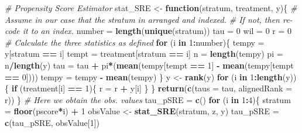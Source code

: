 \documentclass[]{article}
\newenvironment{Shaded}{\begin{snugshade}}{\end{snugshade}}
\newcommand{\KeywordTok}[1]{\textcolor[rgb]{0.13,0.29,0.53}{\textbf{#1}}}
\newcommand{\DataTypeTok}[1]{\textcolor[rgb]{0.13,0.29,0.53}{#1}}
\newcommand{\DecValTok}[1]{\textcolor[rgb]{0.00,0.00,0.81}{#1}}
\newcommand{\StringTok}[1]{\textcolor[rgb]{0.31,0.60,0.02}{#1}}
\newcommand{\CommentTok}[1]{\textcolor[rgb]{0.56,0.35,0.01}{\textit{#1}}}
\newcommand{\ControlFlowTok}[1]{\textcolor[rgb]{0.13,0.29,0.53}{\textbf{#1}}}
\newcommand{\OperatorTok}[1]{\textcolor[rgb]{0.81,0.36,0.00}{\textbf{#1}}}
\newcommand{\NormalTok}[1]{#1}
\begin{document}
\begin{Shaded}
\begin{Highlighting}[]
\CommentTok{# Propensity Score Estimator}
\NormalTok{stat_SRE <-}\StringTok{ }\ControlFlowTok{function}\NormalTok{(stratum, treatment, y)\{}
  \CommentTok{# Assume in our case that the stratum in arranged and indexed.}
  \CommentTok{# If not, then re-code it to an index.}
\NormalTok{  number =}\StringTok{ }\KeywordTok{length}\NormalTok{(}\KeywordTok{unique}\NormalTok{(stratum))}
\NormalTok{  tau =}\StringTok{ }\DecValTok{0}
\NormalTok{  wil =}\StringTok{ }\DecValTok{0}
\NormalTok{  r =}\StringTok{ }\DecValTok{0}
  \CommentTok{# Calculate the three statistics as defined}
  \ControlFlowTok{for}\NormalTok{ (i }\ControlFlowTok{in} \DecValTok{1}\OperatorTok{:}\NormalTok{number)\{}
\NormalTok{    tempy =}\StringTok{ }\NormalTok{y[stratum }\OperatorTok{==}\StringTok{ }\NormalTok{i]}
\NormalTok{    tempt =}\StringTok{ }\NormalTok{treatment[stratum }\OperatorTok{==}\StringTok{ }\NormalTok{i]}
\NormalTok{    n =}\StringTok{ }\KeywordTok{length}\NormalTok{(tempy)}
\NormalTok{    pi =}\StringTok{ }\NormalTok{n}\OperatorTok{/}\KeywordTok{length}\NormalTok{(y)}
\NormalTok{    tau =}\StringTok{ }\NormalTok{tau }\OperatorTok{+}\StringTok{ }\NormalTok{pi}\OperatorTok{*}\NormalTok{(}\KeywordTok{mean}\NormalTok{(tempy[tempt }\OperatorTok{==}\StringTok{ }\DecValTok{1}\NormalTok{] }\OperatorTok{-}\StringTok{ }\KeywordTok{mean}\NormalTok{(tempy[tempt }\OperatorTok{==}\StringTok{ }\DecValTok{0}\NormalTok{])))}
\NormalTok{    tempy =}\StringTok{ }\NormalTok{tempy }\OperatorTok{-}\StringTok{ }\KeywordTok{mean}\NormalTok{(tempy)}
\NormalTok{  \}}
\NormalTok{  y <-}\StringTok{ }\KeywordTok{rank}\NormalTok{(y)}
  \ControlFlowTok{for}\NormalTok{ (i }\ControlFlowTok{in} \DecValTok{1}\OperatorTok{:}\KeywordTok{length}\NormalTok{(y))\{}
    \ControlFlowTok{if}\NormalTok{ (treatment[i] }\OperatorTok{==}\StringTok{ }\DecValTok{1}\NormalTok{)\{}
\NormalTok{      r =}\StringTok{ }\NormalTok{r }\OperatorTok{+}\StringTok{ }\NormalTok{y[i]}
\NormalTok{    \}}
\NormalTok{  \}}
  \KeywordTok{return}\NormalTok{(}\KeywordTok{c}\NormalTok{(}\DataTypeTok{taus =}\NormalTok{ tau, }\DataTypeTok{alignedRank =}\NormalTok{ r))}
\NormalTok{\}}
\CommentTok{# Here we obtain the obs. values}
\NormalTok{tau_pSRE =}\StringTok{ }\KeywordTok{c}\NormalTok{()}
\ControlFlowTok{for}\NormalTok{ (i }\ControlFlowTok{in} \DecValTok{1}\OperatorTok{:}\DecValTok{4}\NormalTok{)\{}
\NormalTok{  stratum =}\StringTok{ }\KeywordTok{floor}\NormalTok{(pscore}\OperatorTok{*}\NormalTok{i) }\OperatorTok{+}\StringTok{ }\DecValTok{1}
\NormalTok{  obsValue <-}\StringTok{ }\KeywordTok{stat_SRE}\NormalTok{(stratum, z, y)}
\NormalTok{  tau_pSRE =}\StringTok{ }\KeywordTok{c}\NormalTok{(tau_pSRE, obsValue[}\DecValTok{1}\NormalTok{])}

\end{Highlighting}
\end{Shaded}
\end{document}
